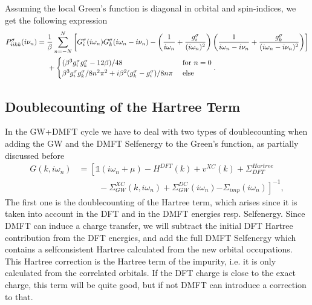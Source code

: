 \documentclass[12pt,a4paper]{scrartcl}
\numberwithin{equation}{section}
\newcommand{\unity}{\mathds{1}}
\begin{document}
Assuming the local Green's function is diagonal in orbital and spin-indices,
we get the following expression
\begin{align}
 P^{\sigma}_{iikk}(i\nu_n)
%
 &=\frac{1}{\beta} \sum_{n=-N}^{N}\left[ G^{\sigma}_{i}(i\omega_n)
                                   G^{\sigma}_{k}(i\omega_n-i\nu_n)
           -\left( \frac{1}{i\omega_n} + \frac{g^{\sigma}_{i}}{(i\omega_n)^2}\right)
            \left(\frac{1}{i\omega_n-i\nu_n} + \frac{g^{\sigma}_{k}}{(i\omega_n-i\nu_n)^2}\right)\right] \nonumber \\
%
&\hspace{0.5cm}+ 
\begin{cases}
  (\beta^3 g^{\sigma}_{i}g^{\sigma}_{k} - 12\beta)/48 & \mbox{ for } n=0 \\
  \beta^3 g^{\sigma}_{i}g^{\sigma}_{k}/8n^2\pi^2
  + i \beta^2 (g^{\sigma}_{k}-g^{\sigma}_{i}) / 8n\pi & \mbox{ else} 
\end{cases}.
\end{align}



 
\subsection{Doublecounting of the Hartree Term}
In the GW+DMFT cycle we have to deal with two types of doublecounting
when adding the GW and the DMFT Selfenergy to the Green's function, as
partially discussed before
\begin{align}
 G(k,i\omega_n) 
 &= \left[ \unity(i\omega_n+\mu ) -H^{DFT}(k) + v^{XC}(k) + \Sigma^{Hartree}_{DFT} \right.\nonumber\\
          & \hspace{1cm}- \Sigma^{XC}_{GW}(k,i\omega_n) 
          + \Sigma_{GW}^{DC}(i\omega_n)
          \left. - \Sigma_{imp}(i\omega_n)
           \right]^{-1},
\end{align}
The first one is the doublecounting of the Hartree term, which arises since it is
taken into account in the DFT and in the DMFT energies resp. Selfenergy.
Since DMFT can induce a charge transfer, we will subtract the initial DFT Hartree
contribution from the DFT energies, and add the full DMFT Selfenergy
which contains a selfconsistent Hartree calculated from the 
new orbital occupations. This Hartree correction is the Hartree term of the impurity,
i.e. it is only calculated from the correlated orbitals.
If the DFT charge is close to the exact charge, this term 
will be quite good, but if not DMFT can introduce a correction to that.
\end{document}
